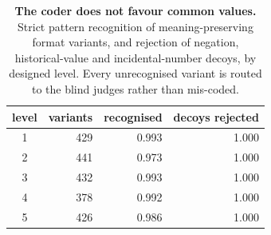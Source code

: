 \begin{table}[t]
\centering\small
\begin{tabular}{crrr}
\toprule
level & variants & recognised & decoys rejected \\
\midrule
1 & 429 & 0.993 & 1.000 \\
2 & 441 & 0.973 & 1.000 \\
3 & 432 & 0.993 & 1.000 \\
4 & 378 & 0.992 & 1.000 \\
5 & 426 & 0.986 & 1.000 \\
\bottomrule
\end{tabular}
\caption{\textbf{The coder does not favour common values.} Strict pattern recognition of meaning-preserving format variants, and rejection of negation, historical-value and incidental-number decoys, by designed level. Every unrecognised variant is routed to the blind judges rather than mis-coded.}
\label{tab:coder}
\end{table}
